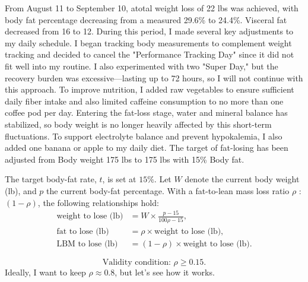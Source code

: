 From August 11 to September 10, atotal weight loss of 22 lbs was achieved, with body fat percentage decreasing from a measured 29.6\% to 24.4\%.  Visceral fat decreased from 16 to 12. During this period, I made several key adjustments to my daily schedule. I began tracking body measurements to complement weight tracking and decided to cancel the "Performance Tracking Day" since it did not fit well into my routine. I also experimented with two "Super Day," but the recovery burden was excessive—lasting up to 72 hours, so I will not continue with this approach. To improve nutrition, I added raw vegetables to ensure sufficient daily fiber intake and also limited caffeine consumption to no more than one coffee pod per day. Entering the fat-loss stage, water and mineral balance has stabilized, so body weight is no longer heavily affected by this short-term fluctuations. To support electrolyte balance and prevent hypokalemia, I also added one banana or apple to my daily diet. The target of fat-losing has been adjusted from Body weight 175 lbs to 175 lbs with 15\% Body fat.

\noindent The target body-fat rate, $t$, is set at $15\%$. Let $W$ denote the current body weight (lb), and $p$ the current body-fat percentage. With a fat-to-lean mass loss ratio $\rho$ : $(1-\rho)$, the following relationships hold:
\begin{equation*}
\begin{aligned}
\text{weight to lose (lb)} & =
W \times
\frac{p - 15}{100\rho - 15},\\
\text{fat to lose (lb)} & = \rho \times \text{weight to lose (lb)},\\
\text{LBM to lose (lb)} & = (1-\rho) \times \text{weight to lose (lb)}.
\end{aligned}
\end{equation*}

\begin{equation*}
\text{Validity condition: } \rho \geq 0.15.
\end{equation*}
Ideally, I want to keep $\rho \approx0.8$, but let's see how it works.


